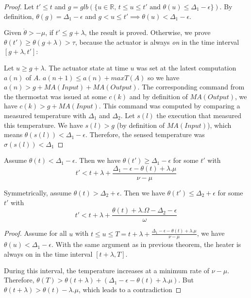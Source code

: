 \begin{proof}
Let $t' \leq t$ and $g = glb(\{u \in \mathbb{R}, \, t \leq u \leq t' \textrm{ and } \theta(u) \leq \Delta_1 - \epsilon\})$. By definition, $\theta(g) = \Delta_1 - \epsilon$ and $g < u \leq t' \implies \theta(u) < \Delta_1 - \epsilon$.

Given $\dot{\theta} > -\mu$, if $t' \leq g + \lambda$, the result is proved. Otherwise, we prove $\theta(t') \geq \theta(g + \lambda) > \tau$, because the actuator is always \textit{on} in the time  interval $[g + \lambda, t']$:

Let $u \geq g + \lambda$. The actuator state at time $u$ was set at the latest computation $a(n)$ of $A$.
$a(n+1) \leq a(n) + maxT(A)$ so we have $a(n) > g + MA(Input) + MA(Output)$.
The corresponding command from the thermostat was issued at some $c(k)$ and by definition of $MA(Output)$,
we have $c(k) > g + MA(Input)$. This command was computed by comparing a measured temperature with $\Delta_1$ and $\Delta_2$.
Let $s(l)$ the execution that measured this temperature. We have $s(l) > g$ (by definition of $MA(Input)$), which means $\theta(s(l)) < \Delta_1 - \epsilon$.
Therefore, the sensed temperature was \mbox{$\sigma(s(l)) < \Delta_1$}
\end{proof}

\begin{thm}

Assume $\theta(t) < \Delta_1 - \epsilon$. Then we have $\theta(t') \geq \Delta_1 - \epsilon$ for some $t'$ with 
\[t' < t + \lambda + \frac {\Delta_1 - \epsilon - \theta(t) + \lambda.\mu} {\nu - \mu} \]

Symmetrically, assume $\theta(t) > \Delta_2 + \epsilon$. Then we have $\theta(t') \leq \Delta_2 + \epsilon$ for some $t'$ with
\[t' < t + \lambda + \frac {\theta(t) + \lambda.\Omega - \Delta_2 - \epsilon} {\omega} \]
\end{thm}

\begin{proof}
Assume for all $u$ with $t \leq u \leq T = t + \lambda + \frac {\Delta_1 - \epsilon - \theta(t) + \lambda.\mu} {\nu - \mu}$, we have $\theta(u) < \Delta_1 - \epsilon$.
With the same argument as in previous theorem, the heater is always on in the time interval $[t + \lambda, T]$. 

During this interval, the temperature increases at a minimum rate of $\nu - \mu$. Therefore, $\theta(T) > \theta(t + \lambda) + (\Delta_1 - \epsilon - \theta(t) + \lambda.\mu)$. But $\theta(t + \lambda) > \theta(t) - \lambda.\mu$, which leads to a contradiction
\end{proof}






